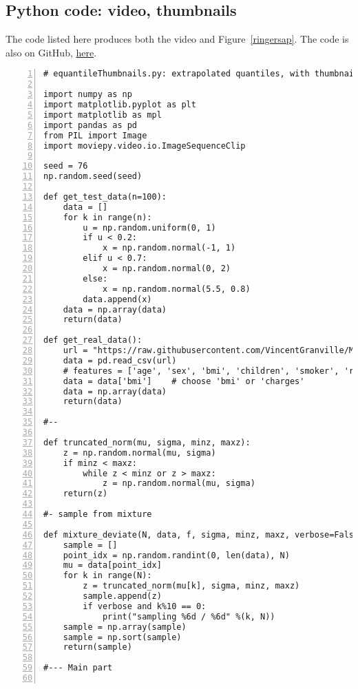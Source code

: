 \documentclass[oneside,10pt]{book}
\begin{document}
\subsection{Python code: video, thumbnails}\label{refresa}

The code listed here produces both the video and Figure~\ref{ringersap}. 
The code is also on GitHub,  \href{https://github.com/VincentGranville/Statistical-Optimization/blob/main/equantile_thumbnails.py}{here}.
\vspace{1ex}

\begin{lstlisting}[numbers=left]
# equantileThumbnails.py: extrapolated quantiles, with thumbnails production

import numpy as np
import matplotlib.pyplot as plt
import matplotlib as mpl
import pandas as pd
from PIL import Image
import moviepy.video.io.ImageSequenceClip

seed = 76
np.random.seed(seed)

def get_test_data(n=100):
    data = []
    for k in range(n):
        u = np.random.uniform(0, 1)
        if u < 0.2:
            x = np.random.normal(-1, 1)
        elif u < 0.7:
            x = np.random.normal(0, 2)
        else: 
            x = np.random.normal(5.5, 0.8)
        data.append(x)
    data = np.array(data)
    return(data)

def get_real_data():
    url = "https://raw.githubusercontent.com/VincentGranville/Main/main/insurance.csv"
    data = pd.read_csv(url)
    # features = ['age', 'sex', 'bmi', 'children', 'smoker', 'region', 'charges'] 
    data = data['bmi']    # choose 'bmi' or 'charges'
    data = np.array(data)
    return(data)

#--

def truncated_norm(mu, sigma, minz, maxz):
    z = np.random.normal(mu, sigma)
    if minz < maxz:
        while z < minz or z > maxz:
            z = np.random.normal(mu, sigma)
    return(z)

#- sample from mixture

def mixture_deviate(N, data, f, sigma, minz, maxz, verbose=False):
    sample = []
    point_idx = np.random.randint(0, len(data), N) 
    mu = data[point_idx]
    for k in range(N):
        z = truncated_norm(mu[k], sigma, minz, maxz)
        sample.append(z)
        if verbose and k%10 == 0:
            print("sampling %6d / %6d" %(k, N))
    sample = np.array(sample)
    sample = np.sort(sample)
    return(sample)

#--- Main part


\end{lstlisting}
\end{document}
